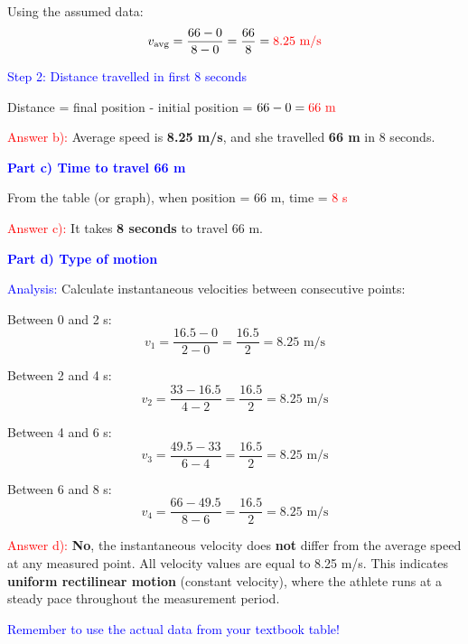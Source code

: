 \begin{exercise}
\begin{solu}
        Using the assumed data:
        \[
            v_{\text{avg}} = \frac{66 - 0}{8 - 0} = \frac{66}{8} = \textcolor{red}{8.25 \text{ m/s}}
        \]

        \textcolor{blue}{Step 2: Distance travelled in first 8 seconds}

        Distance = final position - initial position = $66 - 0 = \textcolor{red}{66 \text{ m}}$

        \textcolor{red}{Answer b):} Average speed is \textbf{8.25 m/s}, and she travelled \textbf{66 m} in 8 seconds.

        \textbf{\textcolor{blue}{Part c) Time to travel 66 m}}

        From the table (or graph), when position = 66 m, time = \textcolor{red}{8 s}

        \textcolor{red}{Answer c):} It takes \textbf{8 seconds} to travel 66 m.

        \textbf{\textcolor{blue}{Part d) Type of motion}}

        \textcolor{blue}{Analysis:} Calculate instantaneous velocities between consecutive points:

        Between 0 and 2 s:
        \[
            v_1 = \frac{16.5 - 0}{2 - 0} = \frac{16.5}{2} = 8.25 \text{ m/s}
        \]

        Between 2 and 4 s:
        \[
            v_2 = \frac{33 - 16.5}{4 - 2} = \frac{16.5}{2} = 8.25 \text{ m/s}
        \]

        Between 4 and 6 s:
        \[
            v_3 = \frac{49.5 - 33}{6 - 4} = \frac{16.5}{2} = 8.25 \text{ m/s}
        \]

        Between 6 and 8 s:
        \[
            v_4 = \frac{66 - 49.5}{8 - 6} = \frac{16.5}{2} = 8.25 \text{ m/s}
        \]

        \textcolor{red}{Answer d):} \textbf{No}, the instantaneous velocity does \textbf{not} differ from the average speed at any measured point. All velocity values are equal to 8.25 m/s. This indicates \textbf{uniform rectilinear motion} (constant velocity), where the athlete runs at a steady pace throughout the measurement period.

        \textcolor{blue}{Remember to use the actual data from your textbook table!}
    \end{solu}
\end{exercise}



